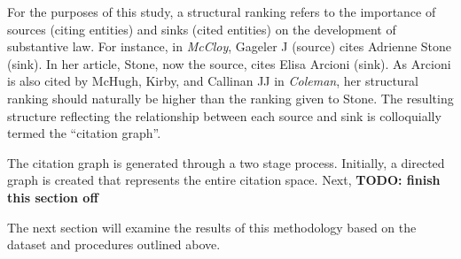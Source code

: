 For the purposes of this study, a structural ranking refers to the importance of sources (citing entities) and sinks (cited entities) on the development of substantive law. For instance, in \textit{McCloy},\xn{} Gageler J (source) cites Adrienne Stone (sink).\xn{} In her article, Stone, now the source, cites Elisa Arcioni (sink).\xn{} As Arcioni is also cited by McHugh, Kirby, and Callinan JJ in \textit{Coleman},\xn{} her structural ranking should naturally be higher than the ranking given to Stone. The resulting structure reflecting the relationship between each source and sink is colloquially termed the ``citation graph''.

The citation graph is generated through a two stage process. Initially, a directed graph is created that represents the entire citation space. Next, \textbf{TODO: finish this section off}


The next section will examine the results of this methodology based on the dataset and procedures outlined above.


